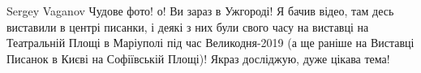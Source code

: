  
 
 
 
 

Sergey Vaganov Чудове фото! о! Ви зараз в Ужгороді! Я бачив відео, там десь
виставили в центрі писанки, і деякі з них були свого часу на виставці на
Театральній Площі в Маріуполі під час Великодня-2019 (а ще раніше на Виставці
Писанок в Києві на Софіївській Площі)! Якраз досліджую, дуже цікава тема!
